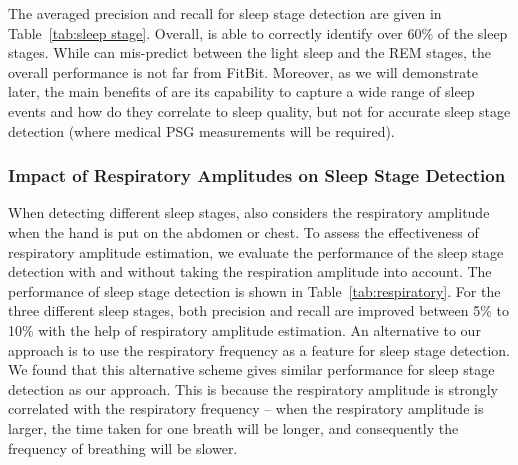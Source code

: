 

The averaged precision and recall for sleep stage detection are given in Table~\ref{tab:sleep stage}. Overall, \systemname is able to
correctly identify over 60\% of the sleep stages. While {\systemname} can mis-predict between the light sleep and the REM stages, the
overall performance is not far from FitBit. Moreover, as we will demonstrate later, the main benefits of {\systemname} are its capability
to capture a wide range of sleep events and how do they correlate to sleep quality, but not for accurate sleep stage detection (where
medical PSG measurements will be required).



\subsubsection{Impact of Respiratory Amplitudes on Sleep Stage Detection}

When detecting different sleep stages, \systemname also considers the respiratory amplitude when the hand is put on the abdomen or chest.
To assess the effectiveness of respiratory amplitude estimation, we evaluate the performance of the sleep stage detection with and without
taking the respiration amplitude into account. The performance of sleep stage detection is shown in Table~\ref{tab:respiratory}. For the
three different sleep stages, both precision and recall are improved between 5\% to 10\% with the help of respiratory amplitude estimation.
An alternative to our approach is to use the respiratory frequency  as a feature for sleep stage detection. We found that this alternative
scheme gives similar performance for sleep stage detection as our approach. This is because the respiratory amplitude is strongly
correlated with the respiratory frequency -- when the respiratory amplitude is larger, the time taken for one breath will be longer, and
consequently the frequency of breathing will be slower.


